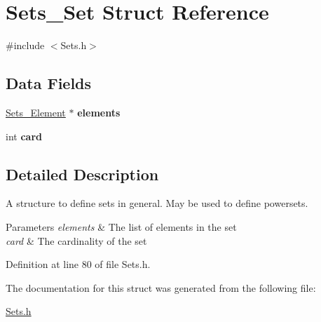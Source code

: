 \hypertarget{struct_sets___set}{
\section{Sets\_\-Set Struct Reference}
\label{struct_sets___set}
}


{\ttfamily \#include $<$Sets.h$>$}

\subsection*{Data Fields}
\begin{DoxyCompactItemize}
\item 
\hypertarget{struct_sets___set_a2f23de91b701f2f4835a0827a4bb39cb}{
\hyperlink{struct_sets___element}{Sets\_\-Element} $\ast$ {\bfseries elements}}
\label{struct_sets___set_a2f23de91b701f2f4835a0827a4bb39cb}

\item 
\hypertarget{struct_sets___set_acd789e381a684163a021e2d228653afd}{
int {\bfseries card}}
\label{struct_sets___set_acd789e381a684163a021e2d228653afd}

\end{DoxyCompactItemize}


\subsection{Detailed Description}
A structure to define sets in general. May be used to define powersets. 
\begin{DoxyParams}{Parameters}
{\em elements} & The list of elements in the set \\
\hline
{\em card} & The cardinality of the set \\
\hline
\end{DoxyParams}


Definition at line 80 of file Sets.h.



The documentation for this struct was generated from the following file:\begin{DoxyCompactItemize}
\item 
\hyperlink{_sets_8h}{Sets.h}\end{DoxyCompactItemize}
